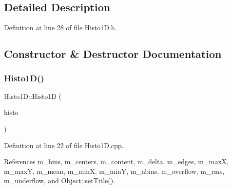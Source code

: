 \subsection{Detailed Description}


Definition at line 28 of file Histo1\+D.\+h.



\subsection{Constructor \& Destructor Documentation}
\mbox{\label{classHisto1D_aecd55af9b972863d5cee5a387746fb96}} 
\subsubsection{\texorpdfstring{Histo1\+D()}{Histo1D()}}
{\footnotesize\ttfamily Histo1\+D\+::\+Histo1D (\begin{DoxyParamCaption}\item[{T\+H1D $\ast$}]{histo }\end{DoxyParamCaption})}



Definition at line 22 of file Histo1\+D.\+cpp.



References m\+\_\+bins, m\+\_\+centers, m\+\_\+content, m\+\_\+delta, m\+\_\+edges, m\+\_\+maxX, m\+\_\+maxY, m\+\_\+mean, m\+\_\+minX, m\+\_\+minY, m\+\_\+nbins, m\+\_\+overflow, m\+\_\+rms, m\+\_\+underflow, and Object\+::set\+Title().


